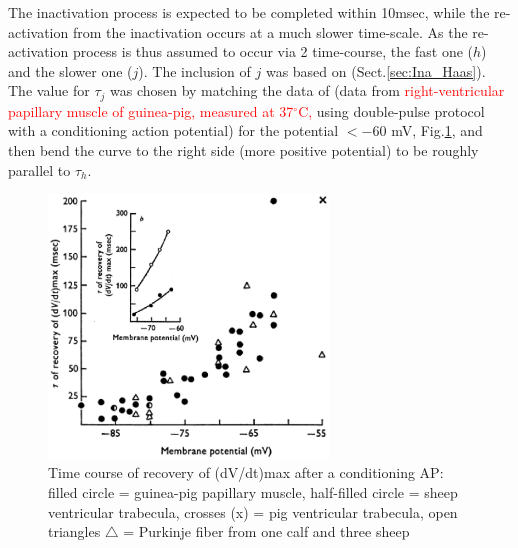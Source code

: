 The inactivation process is expected to be completed within 10msec, while the
re-activation from the inactivation occurs at a much slower time-scale. As the
re-activation process is thus assumed to occur via 2 time-course, the fast one
($h$) and the slower one ($j$). The inclusion of $j$ was based on
\citep{haas1971} (Sect.\ref{sec:Ina_Haas}). The value for $\tau_j$ was chosen by
matching the data of \citep{gettes1974} (data from
\textcolor{red}{right-ventricular papillary muscle of guinea-pig, measured at
37$^\circ$C, } using double-pulse protocol with a conditioning action potential)
for the potential $< -60$ mV, Fig.\ref{fig:Na_tau_j_Gettes1974}, and then bend
the curve to the right side (more positive potential) to be roughly parallel to
$\tau_h$.

\begin{figure}[hbt]
 \centerline{\includegraphics[height=7cm,
 angle=0]{./images/Na_tau_j_Gettes1974.eps}} 
 \caption{Time course of recovery of (dV/dt)max after a conditioning AP: filled
 circle \protect{} = guinea-pig papillary muscle, half-filled circle
 \protect{} = sheep ventricular trabecula, crosses (x) = pig ventricular
 trabecula, open triangles $\triangle$ = Purkinje fiber from one calf and three
 sheep}
\label{fig:Na_tau_j_Gettes1974}
\end{figure}


